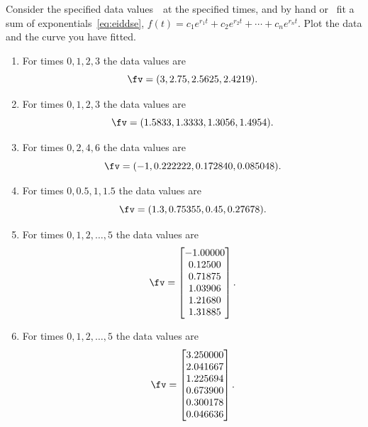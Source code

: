 \begin{exercise} \label{eg:}
Consider the specified data values~\fv\ at the specified times, and by hand or \script\ fit a sum of exponentials~\eqref{eq:eiddse}, \(f(t)=c_1e^{r_1t}+c_2e^{r_2t}+\cdots+c_ne^{r_nt}\).
Plot the data and the curve you have fitted.
\begin{enumerate}
\item For times \(0,1,2,3\) the data values are \[\fv=(3, 2.75, 2.5625, 2.4219).\]

\item For times \(0,1,2,3\) the data values are \[\fv=(1.5833, 1.3333, 1.3056, 1.4954).\]

\item For times \(0,2,4,6\) the data values are \[\fv=(-1, 0.222222, 0.172840, 0.085048).\]

\item For times \(0,0.5,1,1.5\) the data values are \[\fv=(1.3, 0.75355, 0.45, 0.27678).\]

\item For times \(0,1,2,\ldots,5\) the data values are 
\setbox\ajrqrbox\hbox{}\marginpar{\usebox{\ajrqrbox}}%
\[ \fv=\begin{bmatrix} -1.00000
\\ 0.12500
\\ 0.71875
\\ 1.03906
\\ 1.21680
\\ 1.31885 \end{bmatrix}.\]
  
\item For times \(0,1,2,\ldots,5\) the data values are 
\setbox\ajrqrbox\hbox{}\marginpar{\usebox{\ajrqrbox}}%
\[ \fv=\begin{bmatrix} 3.250000
\\ 2.041667
\\ 1.225694
\\ 0.673900
\\ 0.300178
\\ 0.046636 \end{bmatrix}.\]
  

\end{enumerate}
\end{exercise}
